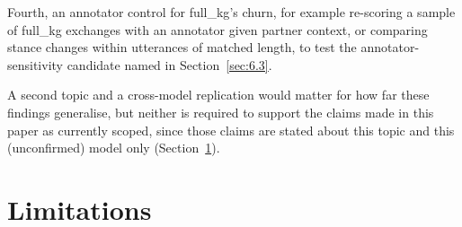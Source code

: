 \documentclass[11pt,a4paper]{article}
\newcommand{\cond}[1]{\textsf{#1}}
\begin{document}
Fourth, an annotator control for \cond{full\_kg}'s churn, for example re-scoring a sample of \cond{full\_kg} exchanges with an annotator given partner context, or comparing stance changes within utterances of matched length, to test the annotator-sensitivity candidate named in Section~\ref{sec:6.3}.

A second topic and a cross-model replication would matter for how far these findings generalise, but neither is required to support the claims made in this paper as currently scoped, since those claims are stated about this topic and this (unconfirmed) model only (Section~\ref{sec:7}).


\section{Limitations}\label{sec:7}
\end{document}
